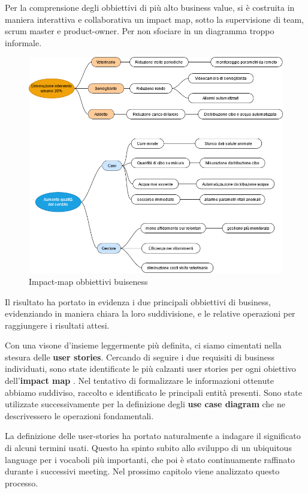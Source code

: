 	Per la comprensione degli obbiettivi di più alto business value, si è costruita in maniera interattiva e collaborativa un impact map, sotto la supervisione di team, scrum master e product-owner. Per non sfociare in un diagramma troppo informale.
	\begin{figure}[ht]
        \caption{Impact-map obbiettivi buiseness}
        \centering
        \includegraphics[width=1\textwidth]{DrawIo/impactMap.png}
    \end{figure}

    Il risultato ha portato in evidenza i due principali obbiettivi di business, evidenziando in maniera chiara la loro suddivisione, e le relative operazioni per raggiungere i risultati attesi.
    
    Con una visone d'insieme leggermente più definita, ci siamo cimentati nella stesura delle \textbf{user stories}. Cercando di seguire i due requisiti di business individuati, sono state identificate le più calzanti user stories per ogni obiettivo  dell'\textbf{impact map}
    .
    Nel tentativo di formalizzare le informazioni ottenute abbiamo suddiviso, raccolto e identificato le principali entità presenti. Sono state utilizzate successivamente per la definizione degli \textbf{use case diagram} che ne descrivessero le operazioni fondamentali.

	La definizione delle user-stories ha portato naturalmente a indagare il significato di alcuni termini usati. Questo ha spinto subito allo sviluppo di un ubiquitous language per i vocaboli più importanti, che poi è stato continuamente raffinato durante i successivi meeting. 
	Nel prossimo capitolo viene analizzato questo processo. 
    
